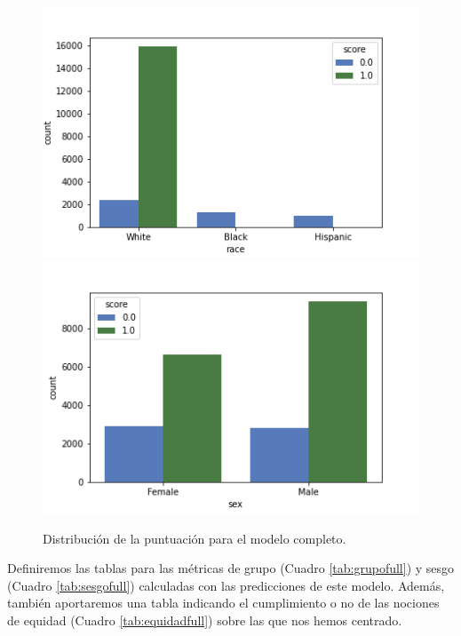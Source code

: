 \documentclass[oneside,openright,titlepage,numbers=noenddot,openany,headinclude,footinclude=true,
cleardoublepage=empty,abstractoff,BCOR=5mm,paper=a4,fontsize=12pt,main=spanish]{scrreprt}
\begin{document}
\begin{figure}[h]
      \includegraphics[width=\linewidth]{images/score_full_race_law.png}
    \endminipage\hfill
      \includegraphics[width=\linewidth]{images/score_full_sex_law.png}
    \endminipage
     \caption{Distribución de la puntuación para el modelo completo.}
     \label{fig:scorefull}
\end{figure}

Definiremos las tablas para las métricas de grupo (Cuadro \ref{tab:grupofull}) y sesgo (Cuadro \ref{tab:sesgofull}) calculadas con las predicciones de este modelo. Además, también aportaremos una tabla indicando el cumplimiento o no de las nociones de equidad (Cuadro \ref{tab:equidadfull}) sobre las que nos hemos centrado.\\
\end{document}
